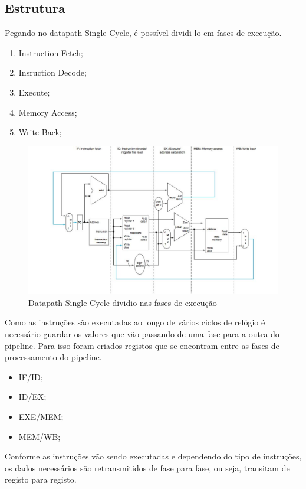 \documentclass[10pt,a4paper]{book}
\begin{document}
		\subsection{Estrutura}

			Pegando no datapath Single-Cycle, é possível dividi-lo em fases de execução.
			\begin{enumerate}
				\item Instruction Fetch;
				\item Insruction Decode;
				\item Execute;
				\item Memory Access;
				\item Write Back;
			\end{enumerate}

			\begin{figure}[htp]
					\centering
					\includegraphics[scale=0.3]{pipeline3.png}
					\caption{Datapath Single-Cycle dividio nas fases de execução }
					\label{SC-division}
			\end{figure}

			Como as instruções são executadas ao longo de vários ciclos de relógio é necessário guardar os valores que vão passando de uma fase para a outra do pipeline. Para isso foram criados registos que se encontram entre as fases de processamento do pipeline.
			\begin{itemize}
				\item IF/ID;
				\item ID/EX;
				\item EXE/MEM;
				\item MEM/WB;
			\end{itemize}

			Conforme as instruções vão sendo executadas e dependendo do tipo de instruções, os dados necessários são retransmitidos de fase para fase, ou seja, transitam de registo para registo.
\end{document}
